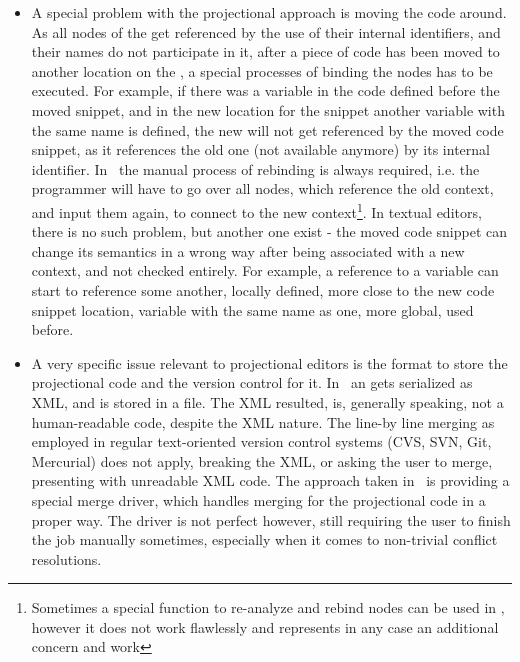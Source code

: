  \begin{itemize}
  \item A special problem with the projectional approach is moving the code around. As all nodes of the  get referenced by the use of their
  internal identifiers, and their names do not participate in it, after a piece of code has been moved to another location on the , 
  a special processes of binding the nodes has to be executed. For example, if there was a variable  in the code defined before the moved snippet,
  and in the new location for the snippet another variable with the same name  is defined, the new  will not get referenced by the 
  moved code snippet, as it references the old one (not available anymore) by its internal identifier. In \jbmps\ the manual process of rebinding is
  always required, i.e. the programmer will have to go over all nodes, which reference the old context, and input them again, to connect to the
  new context\footnote{Sometimes a special function to re-analyze and rebind nodes can be used in \jbmps, however it does not work flawlessly and 
  represents in any case an additional concern and work}. In textual editors, there is no such problem, but another one exist - the moved code snippet can change its semantics in a wrong way
  after being associated with a new context, and not checked entirely. For example, a reference to a variable can start to reference some another, 
  locally defined, more close to the new code snippet location, variable with the same name as one, more global, used before. 
  
  \item  A very specific issue relevant to projectional editors is the format to store the projectional code and the version control for it.
  In \jbmps\ an  gets serialized as XML, and is stored in a file. The XML resulted, is, generally speaking, not a human-readable 
  code, despite the XML nature. The line-by line merging as employed in regular text-oriented version control systems (CVS, SVN, Git, Mercurial)
  does not apply, breaking the XML, or asking the user to merge, presenting with unreadable XML code. The approach taken in \jbmps\ is providing
  a special merge driver, which handles merging for the projectional code in a proper way. The driver is not perfect however, still requiring 
  the user to finish the job manually sometimes, especially when it comes to non-trivial conflict resolutions.
  

\end{itemize}

